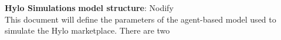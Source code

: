 \documentclass{article}
\title{}
\author{}
\date{\today}
\begin{document}
\renewcommand{\E}{\mathbb{E}}
\renewcommand{\V}{\mathbb{V}}
\renewcommand{\P}{\mathbb{P}}
\renewcommand{\with}{\hspace{8pt}\mbox{with}\hspace{6pt}}
\setlength{\parindent}{0in}

\textbf{Hylo Simulations} \hfill
\textbf{model structure}: Nodify \\

This document will define the parameters of the agent-based model used
to simulate the Hylo marketplace.  There are two 
\end{document}
